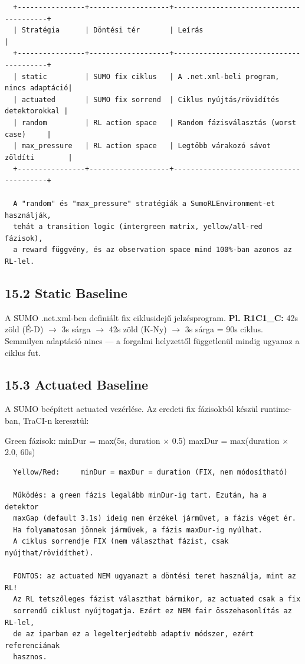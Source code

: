 \documentclass[11pt,a4paper]{article}
\begin{document}
\vspace{1em}\begin{verbatim}
  +----------------+-------------------+----------------------------------------+
  | Stratégia      | Döntési tér       | Leírás                                 |
  +----------------+-------------------+----------------------------------------+
  | static         | SUMO fix ciklus   | A .net.xml-beli program, nincs adaptáció|
  | actuated       | SUMO fix sorrend  | Ciklus nyújtás/rövidítés detektorokkal |
  | random         | RL action space   | Random fázisválasztás (worst case)     |
  | max_pressure   | RL action space   | Legtöbb várakozó sávot zöldíti        |
  +----------------+-------------------+----------------------------------------+

  A "random" és "max_pressure" stratégiák a SumoRLEnvironment-et használják,
  tehát a transition logic (intergreen matrix, yellow/all-red fázisok),
  a reward függvény, és az observation space mind 100%-ban azonos az RL-lel.

\end{verbatim}
\subsection*{15.2 Static Baseline}
A SUMO .net.xml-ben definiált fix ciklusidejű jelzésprogram.
\textbf{Pl. R1C1\_C:} 42s zöld (É-D) $\rightarrow$ 3s sárga $\rightarrow$ 42s zöld (K-Ny) $\rightarrow$ 3s sárga = 90s ciklus.
Semmilyen adaptáció nincs — a forgalmi helyzettől függetlenül mindig
ugyanaz a ciklus fut.

\subsection*{15.3 Actuated Baseline}
A SUMO beépített actuated vezérlése. Az eredeti fix fázisokból készül
runtime-ban, TraCI-n keresztül:

Green fázisok:  minDur = max(5s, duration × 0.5)
maxDur = max(duration × 2.0, 60s)
\vspace{1em}\begin{verbatim}
  Yellow/Red:     minDur = maxDur = duration (FIX, nem módosítható)

  Működés: a green fázis legalább minDur-ig tart. Ezután, ha a detektor
  maxGap (default 3.1s) ideig nem érzékel járművet, a fázis véget ér.
  Ha folyamatosan jönnek járművek, a fázis maxDur-ig nyúlhat.
  A ciklus sorrendje FIX (nem választhat fázist, csak nyújthat/rövidíthet).

  FONTOS: az actuated NEM ugyanazt a döntési teret használja, mint az RL!
  Az RL tetszőleges fázist választhat bármikor, az actuated csak a fix
  sorrendű ciklust nyújtogatja. Ezért ez NEM fair összehasonlítás az RL-lel,
  de az iparban ez a legelterjedtebb adaptív módszer, ezért referenciának
  hasznos.

\end{verbatim}
\end{document}
